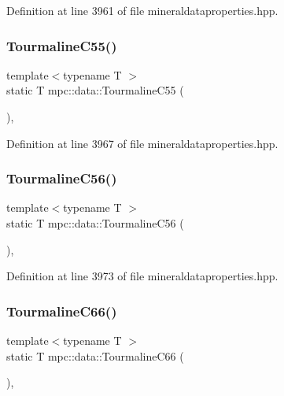Definition at line 3961 of file mineraldataproperties.\+hpp.

\mbox{\label{namespacempc_1_1data_a395bbe9d4a72888eb96863ee33802760}} 
\subsubsection{\texorpdfstring{Tourmaline\+C55()}{TourmalineC55()}}
{\footnotesize\ttfamily template$<$typename T $>$ \\
static T mpc\+::data\+::\+Tourmaline\+C55 (\begin{DoxyParamCaption}{ }\end{DoxyParamCaption})\hspace{0.3cm}{\ttfamily [inline]}, {\ttfamily [static]}}



Definition at line 3967 of file mineraldataproperties.\+hpp.

\mbox{\label{namespacempc_1_1data_a14b58a8cde6ec2fd720c6404692e5c22}} 
\subsubsection{\texorpdfstring{Tourmaline\+C56()}{TourmalineC56()}}
{\footnotesize\ttfamily template$<$typename T $>$ \\
static T mpc\+::data\+::\+Tourmaline\+C56 (\begin{DoxyParamCaption}{ }\end{DoxyParamCaption})\hspace{0.3cm}{\ttfamily [inline]}, {\ttfamily [static]}}



Definition at line 3973 of file mineraldataproperties.\+hpp.

\mbox{\label{namespacempc_1_1data_aa081531456ffbf5e26b0587b146b7a94}} 
\subsubsection{\texorpdfstring{Tourmaline\+C66()}{TourmalineC66()}}
{\footnotesize\ttfamily template$<$typename T $>$ \\
static T mpc\+::data\+::\+Tourmaline\+C66 (\begin{DoxyParamCaption}{ }\end{DoxyParamCaption})\hspace{0.3cm}{\ttfamily [inline]}, {\ttfamily [static]}}



